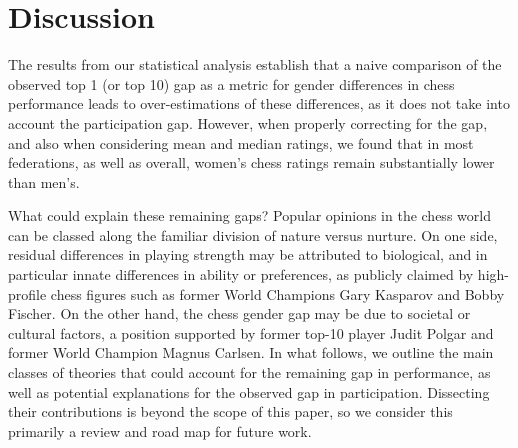 \documentclass[9pt,twocolumn,twoside,lineno]{pnas-new}
\begin{document}
\section*{Discussion}

The results from our statistical analysis establish that a naive comparison of the observed top 1 (or top 10) gap as a metric for gender differences in chess performance leads to over-estimations of these differences, as it does not take into account the participation gap. However, when properly correcting for the gap, and also when considering mean and median ratings, we found that in most federations, as well as overall, women's chess ratings remain substantially lower than men's.

What could explain these remaining gaps? Popular opinions in the chess world can be classed along the familiar division of nature versus nurture. On one side, residual differences in playing strength may be attributed to biological, and in particular innate differences in ability or preferences, as publicly claimed by high-profile chess figures such as former World Champions Gary Kasparov and Bobby Fischer. On the other hand, the chess gender gap may be due to societal or cultural factors, a position supported by former top-10 player Judit Polgar and former World Champion Magnus Carlsen. In what follows, we outline the main classes of theories that could account for the remaining gap in performance, as well as potential explanations for the observed gap in participation. Dissecting their contributions is beyond the scope of this paper, so we consider this primarily a review and road map for future work.




\end{document}
